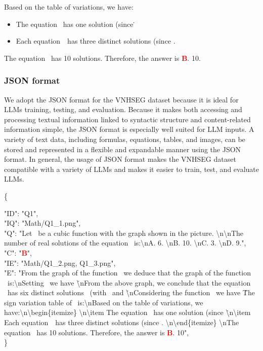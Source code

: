 \documentclass{article}
\begin{document}
{\begin{multicols}{2}
Based on the table of variations, we have: 
		\begin{itemize}
			\item The equation \ has one solution (since \.
			\item Each equation~\ has three distinct solutions (since . 
		\end{itemize}
		The equation \ has 10 solutions. Therefore, the answer is \textcolor{red}{\textbf{B}}. 10. 		
	\end{multicols}	
	
	\subsubsection{JSON format}
	
	We adopt the JSON format for the VNHSEG dataset because it is ideal for LLMs training, testing, and evaluation. Because it makes both accessing and processing textual information linked to syntactic structure and content-related information simple, the JSON format is especially well suited for LLM inputs. A variety of text data, including formulas, equations, tables, and images, can be stored and represented in a flexible and expandable manner using the JSON format. In general, the usage of JSON format makes the VNHSEG dataset compatible with a variety of LLMs and makes it easier to train, test, and evaluate LLMs. 
	


	\begin{multicols}{2}	
		\{
		
		"ID": "Q1", \\
		"IQ": "Math/Q1\_1.png", \\
		"Q": "Let \ be a cubic function with the graph shown in the picture. \textbackslash{}n\textbackslash{}nThe number of real solutions of the equation \ is:\textbackslash{}nA. 6.    \textbackslash{}nB. 10. \textbackslash{}nC. 3. \textbackslash{}nD. 9.", \\
		"C": "\textcolor{red}{\textbf{B}}", \\
		"IE": "Math/Q1\_2.png, Q1\_3.png", \\
		"E": "From the graph of the function \, we deduce that the graph of the function \ is:\textbackslash{}nSetting \, we have \. \textbackslash{}nFrom the above graph, we conclude that the equation \ has six distinct solutions \ (with \ and \. \textbackslash{}nConsidering the function \, we have \.The sign variation table of \ is:\textbackslash{}nBased on the table of variations, we have:\textbackslash{}n\textbackslash{}begin\{itemize\} \textbackslash{}n\textbackslash{}item The equation \ has one solution (since \. \textbackslash{}n\textbackslash{}item Each equation~\ has three distinct solutions (since . \textbackslash{}n\textbackslash{}end\{itemize\} \textbackslash{}nThe equation \ has 10 solutions. Therefore, the answer is \textcolor{red}{\textbf{B}}. 10", \\
		\}
		

\end{multicols}}
\end{document}

